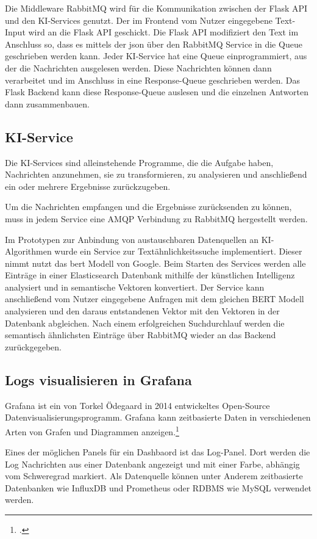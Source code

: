 Die Middleware RabbitMQ wird für die Kommunikation zwischen der Flask API und den KI-Services genutzt. Der im Frontend vom Nutzer eingegebene Text-Input wird an die Flask API geschickt. Die Flask API modifiziert den Text im Anschluss so, dass es mittels der \ac{json} über den RabbitMQ Service in die Queue geschrieben werden kann. Jeder KI-Service hat eine Queue einprogrammiert, aus der die Nachrichten ausgelesen werden. Diese Nachrichten können dann verarbeitet und im Anschluss in eine Response-Queue geschrieben werden. Das Flask Backend kann diese Response-Queue auslesen und die einzelnen Antworten dann zusammenbauen.

\subsection{KI-Service}
Die KI-Services sind alleinstehende Programme, die die Aufgabe haben, Nachrichten anzunehmen, sie zu transformieren, zu analysieren und anschließend ein oder mehrere Ergebnisse zurückzugeben. 

Um die Nachrichten empfangen und die Ergebnisse zurücksenden zu können, muss in jedem Service eine AMQP Verbindung zu RabbitMQ hergestellt werden.

Im Prototypen zur Anbindung von austauschbaren Datenquellen an KI-Algorithmen wurde ein Service zur Textähnlichkeitssuche implementiert. Dieser nimmt nutzt das \ac{bert} Modell von Google. Beim Starten des Services werden alle Einträge in einer Elasticsearch Datenbank mithilfe der künstlichen Intelligenz analysiert und in semantische Vektoren konvertiert. Der Service kann anschließend vom Nutzer eingegebene Anfragen mit dem gleichen BERT Modell analysieren und den daraus entstandenen Vektor mit den Vektoren in der Datenbank abgleichen. Nach einem erfolgreichen Suchdurchlauf werden die semantisch ähnlichsten Einträge über RabbitMQ wieder an das Backend zurückgegeben.

\subsection{Logs visualisieren in Grafana}
Grafana ist ein von Torkel Ödegaard in 2014 entwickeltes Open-Source Datenvisualisierungsprogramm. Grafana kann zeitbasierte Daten in verschiedenen Arten von Grafen und Diagrammen anzeigen.\footcite{chakraborty2021grafana}

Eines der möglichen Panels für ein Dashbaord ist das Log-Panel. Dort werden die Log Nachrichten aus einer Datenbank angezeigt und mit einer Farbe, abhängig vom Schweregrad markiert. Als Datenquelle können unter Anderem zeitbasierte Datenbanken wie InfluxDB und Prometheus oder RDBMS wie MySQL verwendet werden.

